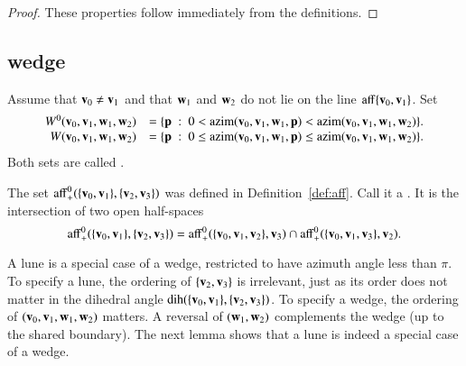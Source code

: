 \begin{proof}
These properties follow immediately from the definitions.
\end{proof}



\subsection{wedge}
%


\begin{definition}[wedge]
Assume that ${\mathbf v}_0\ne {\mathbf v}_1$ and that
${\mathbf w}_1$ and ${\mathbf w}_2$ do not lie on
the line ${\operatorname{aff}}\{{\mathbf v}_0,{\mathbf v}_1\}$.  Set
\begin{displaymath}
\begin{array}{rll}
W^0(\v_0,\v_1,\w_1,\w_2) &= 
\{\p %
\mid 
0< \op{azim}(\v_0,\v_1,\w_1,\p) < \op{azim}(\v_0,\v_1,\w_1,\w_2)\}.\\
W(\v_0,\v_1,\w_1,\w_2) &= 
\{\p \mid 
0\le \op{azim}(\v_0,\v_1,\w_1,\p) \le \op{azim}(\v_0,\v_1,\w_1,\w_2)\}.\\
\end{array}
\end{displaymath}
Both sets are called .
\end{definition}

\begin{definition}[lune]
The set ${\operatorname{aff}}^0_+(\{{\mathbf v}_0,{\mathbf v}_1\},\{{\mathbf v}_2,{\mathbf v}_3\})$ was defined
in Definition~\ref{def:aff}.  Call it a .  It is the intersection
of two open half-spaces
\begin{displaymath}
{\operatorname{aff}}^0_+(\{{\mathbf v}_0,{\mathbf v}_1\},\{{\mathbf v}_2,{\mathbf v}_3\})
={\operatorname{aff}}^0_+(\{{\mathbf v}_0,{\mathbf v}_1,{\mathbf v}_2\},{\mathbf v}_3)\cap
{\operatorname{aff}}^0_+(\{{\mathbf v}_0,{\mathbf v}_1,{\mathbf v}_3\},{\mathbf v}_2).
\end{displaymath}
\end{definition}

A lune is a special case of a wedge, restricted to have azimuth angle
less than $\pi$.  To specify a lune, the ordering of $\{{\mathbf v}_2,{\mathbf v}_3\}$
is irrelevant, just as its order does not matter in the dihedral angle 
$\operatorname{dih}(\{{\mathbf v}_0,{\mathbf v}_1\},\{{\mathbf v}_2,{\mathbf v}_3\})$.  To specify a wedge, the ordering
of $({\mathbf v}_0,{\mathbf v}_1,{\mathbf w}_1,{\mathbf w}_2)$ matters.  A reversal of $({\mathbf w}_1,{\mathbf w}_2)$ complements
the wedge (up to the shared boundary).  The next lemma shows that
a lune is indeed a special case of a wedge.
%
%
%
%
%
%

